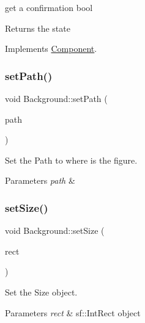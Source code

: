 get a confirmation bool 

\begin{DoxyReturn}{Returns}
the state 
\end{DoxyReturn}


Implements \hyperlink{classComponent_aede74a18a443413465216f383a046028}{Component}.

\mbox{\label{classBackground_a3c7b1c14ebc2ddad845e55eb2e214ce5}} 
\subsubsection{\texorpdfstring{set\+Path()}{setPath()}}
{\footnotesize\ttfamily void Background\+::set\+Path (\begin{DoxyParamCaption}\item[{std\+::string}]{path }\end{DoxyParamCaption})}



Set the Path to where is the figure. 


\begin{DoxyParams}{Parameters}
{\em path} & \\
\hline
\end{DoxyParams}
\mbox{\label{classBackground_a015a2adae388abae75d6451273c61099}} 
\subsubsection{\texorpdfstring{set\+Size()}{setSize()}}
{\footnotesize\ttfamily void Background\+::set\+Size (\begin{DoxyParamCaption}\item[{sf\+::\+Int\+Rect}]{rect }\end{DoxyParamCaption})}



Set the Size object. 


\begin{DoxyParams}{Parameters}
{\em rect} & sf\+::\+Int\+Rect object \\
\hline
\end{DoxyParams}
\mbox{\label{classBackground_adee3f510209c8a2a53b4b2b2d27d27e5}} 

